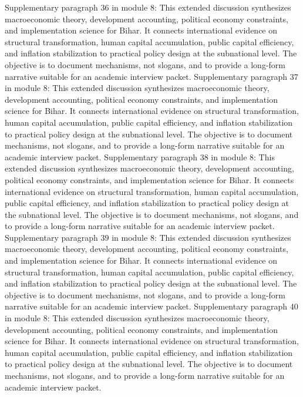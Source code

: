 \documentclass[preprint,12pt]{elsarticle}
\begin{document}
Supplementary paragraph 36 in module 8: This extended discussion synthesizes macroeconomic theory, development accounting, political economy constraints, and implementation science for Bihar. It connects international evidence on structural transformation, human capital accumulation, public capital efficiency, and inflation stabilization to practical policy design at the subnational level. The objective is to document mechanisms, not slogans, and to provide a long-form narrative suitable for an academic interview packet.
Supplementary paragraph 37 in module 8: This extended discussion synthesizes macroeconomic theory, development accounting, political economy constraints, and implementation science for Bihar. It connects international evidence on structural transformation, human capital accumulation, public capital efficiency, and inflation stabilization to practical policy design at the subnational level. The objective is to document mechanisms, not slogans, and to provide a long-form narrative suitable for an academic interview packet.
Supplementary paragraph 38 in module 8: This extended discussion synthesizes macroeconomic theory, development accounting, political economy constraints, and implementation science for Bihar. It connects international evidence on structural transformation, human capital accumulation, public capital efficiency, and inflation stabilization to practical policy design at the subnational level. The objective is to document mechanisms, not slogans, and to provide a long-form narrative suitable for an academic interview packet.
Supplementary paragraph 39 in module 8: This extended discussion synthesizes macroeconomic theory, development accounting, political economy constraints, and implementation science for Bihar. It connects international evidence on structural transformation, human capital accumulation, public capital efficiency, and inflation stabilization to practical policy design at the subnational level. The objective is to document mechanisms, not slogans, and to provide a long-form narrative suitable for an academic interview packet.
Supplementary paragraph 40 in module 8: This extended discussion synthesizes macroeconomic theory, development accounting, political economy constraints, and implementation science for Bihar. It connects international evidence on structural transformation, human capital accumulation, public capital efficiency, and inflation stabilization to practical policy design at the subnational level. The objective is to document mechanisms, not slogans, and to provide a long-form narrative suitable for an academic interview packet.
\end{document}
